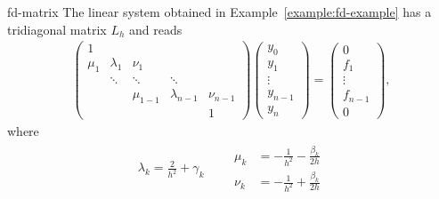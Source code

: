 \begin{Example}{fd-matrix}
  The linear system obtained in Example~\ref{example:fd-example} has a
  tridiagonal matrix $L_h$ and reads
  \begin{gather}
    \label{eq:fd-matrix:1}
    \begin{pmatrix}
      1 \\
      \mu_1 & \lambda_1 & \nu_1 \\
      & \ddots & \ddots & \ddots \\
      &&\mu_{1-1} & \lambda_{n-1} & \nu_{n-1} \\
      &&&&1
    \end{pmatrix}
    \begin{pmatrix}
      y_0 \\y_1\\\vdots\\y_{n-1}\\y_n
    \end{pmatrix}
    =
    \begin{pmatrix}
      0 \\ f_1 \\ \vdots \\f_{n-1} \\ 0
    \end{pmatrix},
  \end{gather}
  where
  \begin{gather*}
    \lambda_k = \frac2{h^2} + \gamma_k
    \qquad
    \begin{aligned}
    \mu_k &= -\frac1{h^2} - \frac{\beta_k}{2h} \\
    \nu_k &= -\frac1{h^2} + \frac{\beta_k}{2h}      
    \end{aligned}
  \end{gather*}
\end{Example}

